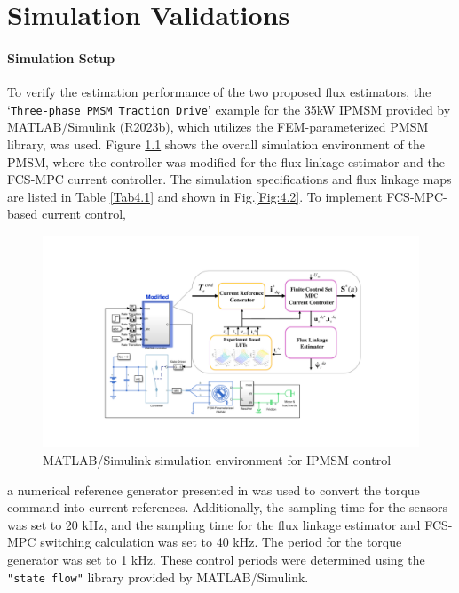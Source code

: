 \chapter{Simulation Validations}\label{chapter4}
\subsubsection{Simulation Setup}
To verify the estimation performance of the two proposed flux estimators, the `\texttt{Three-phase PMSM Traction Drive}' example for the 35kW IPMSM provided by MATLAB/Simulink (R2023b), which utilizes the FEM-parameterized PMSM library, was used. Figure \ref{Fig:4.1} shows the overall simulation environment of the PMSM, where the controller was modified for the flux linkage estimator and the FCS-MPC current controller. The simulation specifications and flux linkage maps are listed in Table \ref{Tab4.1} and shown in Fig.\ref{Fig:4.2}. 
To implement FCS-MPC-based current control, \begin{figure}[h]
    \centering
    \includegraphics[scale=0.53]{chapters/Fig4.1.pdf}
    \caption{MATLAB/Simulink simulation environment for IPMSM control}
    \label{Fig:4.1}
\end{figure}a numerical reference generator presented in \cite{c1_2} was used to convert the torque command into current references. Additionally, the sampling time for the sensors was set to 20 kHz, and the sampling time for the flux linkage estimator and FCS-MPC switching calculation was set to 40 kHz. The period for the torque generator was set to 1 kHz. These control periods were determined using the \texttt{"state flow"} library provided by MATLAB/Simulink. 
